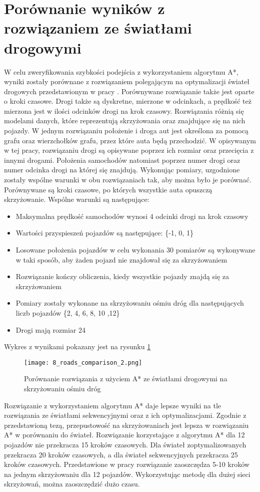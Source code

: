\section{Porównanie wyników z rozwiązaniem ze światłami drogowymi}

W celu zweryfikowania szybkości podejścia z wykorzystaniem algorytmu A*, wyniki zostały porównane z rozwiązaniem polegającym na optymalizacji świateł drogowych przedstawionym w pracy \cite{slakomy}. Porównywane rozwiązanie także jest oparte o kroki czasowe. Drogi także są dyskretne, mierzone w odcinkach, a prędkość też mierzona jest w ilości odcinków drogi na krok czasowy.
\newline
\indent
Rozwiązania różnią się modelami danych, które reprezentują skrzyżowania oraz znajdujące się na nich pojazdy. W jednym rozwiązaniu położenie i droga aut jest określona za pomocą grafu oraz wierzchołków grafu, przez które auta będą przechodzić. W opisywanym w tej pracy, rozwiązaniu drogi są opisywane poprzez ich rozmiar oraz przecięcia z innymi drogami. Położenia samochodów natomiast poprzez numer drogi oraz numer odcinka drogi na której się znajdują.
\newline
\indent
Wykonując pomiary, uzgodnione zostały wspólne warunki w obu rozwiązaniach tak, aby można było je porównać. Porównywane są kroki czasowe, po których wszystkie auta opuszczą skrzyżowanie. Wspólne warunki są następujące:
\begin{itemize}
\item Maksymalna prędkość samochodów wynosi 4 odcinki drogi na krok czasowy
\item Wartości przyspieszeń pojazdów są następujące: \{-1, 0, 1\}
\item Losowane położenia pojazdów w celu wykonania 30 pomiarów są wykonywane w taki sposób, aby żaden pojazd nie znajdował się za skrzyżowaniem
\item Rozwiązanie kończy obliczenia, kiedy wszystkie pojazdy znajdą się za skrzyżowaniem
\item Pomiary zostały wykonane na skrzyżowaniu ośmiu dróg dla następujących liczb pojazdów \{2, 4, 6, 8, 10 ,12\}
\item Drogi mają rozmiar 24
\end{itemize}
Wykres z wynikami pokazany jest na rysunku \ref{comparison}
\begin{figure}[H]
  \texttt{[image: 8\_roads\_comparison\_2.png]}
  \caption{Porównanie rozwiązania z użyciem A* ze światłami drogowymi na skrzyżowaniu ośmiu dróg}
  \label{comparison}
\end{figure}
Rozwiązanie z wykorzystaniem algorytmu A* daje lepsze wyniki na tle rozwiązania ze światłami sekwencyjnymi oraz z ich optymalizacjami. Zgodnie z przedstawioną tezą, przepustowość na skrzyżowaniach jest lepsza w rozwiązaniu A* w porównaniu do świateł. Rozwiązanie korzystające z algorytmu A* dla 12 pojazdów nie przekracza 15 kroków czasowych. Dla świateł zoptymalizowanych przekracza 20 kroków czasowych, a dla świateł sekwencyjnych przekracza 25 kroków czasowych. Przedstawione w pracy rozwiązanie zaoszczędza 5-10 kroków na jednym skrzyżowaniu dla 12 pojazdów. Wykorzystując metodę dla dużej sieci skrzyżowań, można zaoszczędzić dużo czasu.
